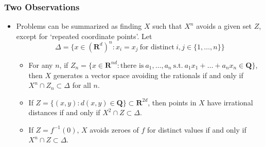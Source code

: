 \documentclass[usenames,dvipsnames]{beamer}
\begin{document}
\begin{frame}
    \frametitle{Two Observations}

    \begin{itemize}
        \item Problems can be summarized as finding $X$ such that $X^n$ avoids a given set $Z$, except for `repeated coordinate points'. Let
        \[ \Delta = \{ x \in (\mathbf{R}^d)^n: x_i = x_j\ \text{for distinct}\ i,j \in \{ 1, \dots, n \} \} \]
        \vspace{-1.5em}


        \begin{itemize}
            \pause
           \item For any $n$, if $Z_n = \{ x \in \mathbf{R}^{nd}: \text{there is}\ a_1, \dots, a_n\ \text{s.t.}\ a_1x_1 + \dots + a_nx_n \in \mathbf{Q} \}$, then $X$ generates a vector space avoiding the rationals if and only if $X^n \cap Z_n \subset \Delta$ for all $n$.

           \pause
            \item If $Z = \{ (x,y): d(x,y) \in \mathbf{Q} \} \subset \mathbf{R}^{2d}$, then points in $X$ have irrational distances if and only if $X^2 \cap Z \subset \Delta$.

            \pause
            \item If $Z = f^{-1}(0)$, $X$ avoids zeroes of $f$ for distinct values if and only if $X^n \cap Z \subset \Delta$.
        \end{itemize}
    \end{itemize}
\end{frame}
\end{document}

